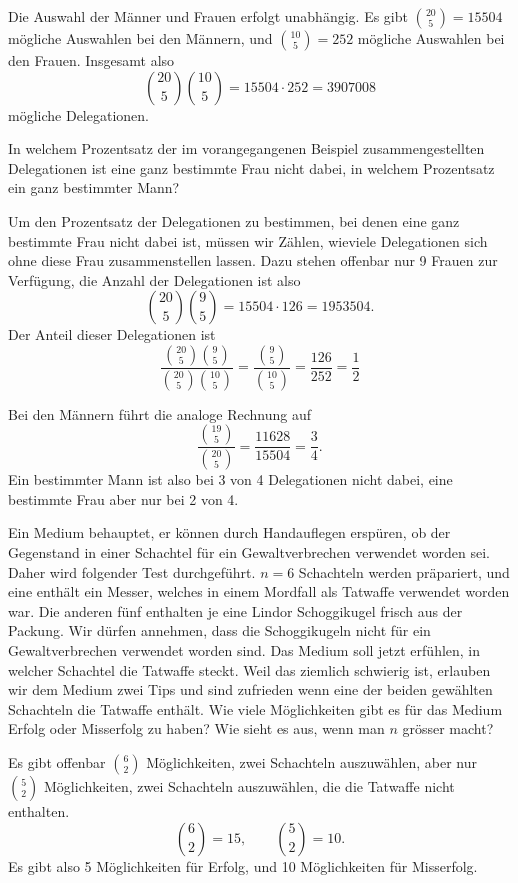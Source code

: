 \begin{beispiele}
\begin{loesung}
Die Auswahl der Männer und Frauen erfolgt unabhängig.
Es gibt
$\binom{20}{5}=15504$ mögliche Auswahlen bei den Männern,
und $\binom{10}{5}=252$ mögliche Auswahlen bei den Frauen.
Insgesamt also
\[
\binom{20}{5}\binom{10}{5}=15504\cdot 252 = 3907008
\]
mögliche Delegationen.
\end{loesung}

\item In welchem Prozentsatz der im vorangegangenen Beispiel
zusammengestellten Delegationen ist eine ganz bestimmte Frau
nicht dabei, in welchem Prozentsatz ein ganz bestimmter Mann?

\begin{loesung}
Um den Prozentsatz der Delegationen zu bestimmen, bei denen
eine ganz bestimmte Frau nicht dabei ist, müssen wir Zählen,
wieviele Delegationen sich ohne diese Frau zusammenstellen 
lassen.
Dazu stehen offenbar nur 9 Frauen zur Verfügung, die 
Anzahl der Delegationen ist also
\[
\binom{20}{5}\binom{9}{5}=15504\cdot 126 = 1953504.
\]
Der Anteil dieser Delegationen ist
\[
\frac{
\binom{20}{5}\binom{9}{5}
}{
\binom{20}{5}\binom{10}{5}
}
=
\frac{ \binom{9}{5} }{ \binom{10}{5} }
=
\frac{126}{252}=\frac12
\]
\end{loesung}
Bei den Männern führt die analoge Rechnung auf
\[
\frac{\binom{19}{5}}{\binom{20}{5}}=\frac{11628}{15504}=\frac34.
\]
Ein bestimmter Mann ist also bei 3 von 4 Delegationen nicht dabei,
eine bestimmte Frau aber nur bei 2 von 4.
\item Ein Medium behauptet, er können durch Handauflegen erspüren, ob
der Gegenstand in einer Schachtel für ein Gewaltverbrechen verwendet
worden sei.
Daher wird folgender Test durchgeführt.
$n=6$
Schachteln werden präpariert, und eine enthält ein Messer,
welches in einem Mordfall als Tatwaffe verwendet worden war.
Die anderen fünf enthalten je eine Lindor Schoggikugel frisch aus der Packung.
Wir dürfen annehmen, dass die Schoggikugeln nicht für ein Gewaltverbrechen
verwendet worden sind.
Das Medium soll jetzt erfühlen, in welcher
Schachtel die Tatwaffe steckt.
Weil das ziemlich schwierig ist, erlauben
wir dem Medium zwei Tips und sind zufrieden wenn eine der beiden
gewählten Schachteln die Tatwaffe enthält.
Wie viele Möglichkeiten gibt
es für das Medium Erfolg oder Misserfolg zu haben?
Wie sieht es aus, wenn man $n$ grösser macht?

\begin{loesung}
Es gibt offenbar $\binom{6}{2}$ Möglichkeiten, zwei Schachteln auszuwählen,
aber nur $\binom{5}{2}$ Möglichkeiten, zwei Schachteln auszuwählen,
die die Tatwaffe nicht enthalten.
\[
\binom{6}{2}=15,\qquad\binom{5}{2}=10.
\]
Es gibt also 5 Möglichkeiten für Erfolg, und 10 Möglichkeiten
für Misserfolg.


\end{loesung}
\end{beispiele}
